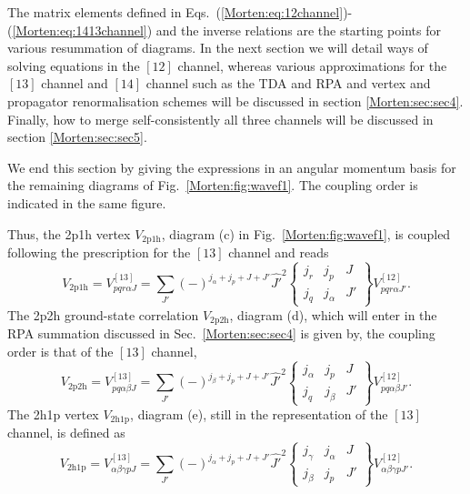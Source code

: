 The matrix elements defined in 
Eqs.~(\ref{Morten:eq:12channel})-(\ref{Morten:eq:1413channel}) 
and the inverse relations are the 
starting points for various resummation of diagrams.
In the next section we will detail ways of solving equations
in the $[12]$ channel, whereas various approximations for the 
$[13]$ channel and $[14]$ channel such as the TDA and RPA 
and  vertex and propagator renormalisation schemes 
will be discussed in section \ref{Morten:sec:sec4}. Finally, how to
merge self-consistently  all three channels will be discussed
in section \ref{Morten:sec:sec5}.

We end this section by giving the expressions in an angular momentum
basis for the remaining 
diagrams of Fig.~\ref{Morten:fig:wavef1}. The coupling order is indicated
in the same figure. 

Thus, the 2p1h vertex $V_{\mathrm{2p1h}}$, 
diagram (c) in  Fig.~\ref{Morten:fig:wavef1}, 
is coupled
following the prescription for the $[13]$ channel and reads
\begin{equation}
      V_{\mathrm{2p1h}}=V_{pqr\alpha J}^{[13]}=
      {\displaystyle \sum_{J'}}(-)^{j_{\alpha}+j_p+J+J'}\hat{J'}^2
      \left\{
      \begin{array}{ccc}
       j_r&j_p&J\\j_q&j_{\alpha}&J'
      \end{array}
       \right\}
       V_{pqr\alpha J'}^{[12]}.
       \label{Morten:eq:2p1hv}
\end{equation}
The 2p2h ground-state correlation $V_{\mathrm{2p2h}}$, diagram (d),
 which will enter
in the RPA summation discussed in Sec.~\ref{Morten:sec:sec4} is given by,
the coupling order is that of the $[13]$ channel, 
\begin{equation}
      V_{\mathrm{2p2h}}=V_{pq\alpha\beta J}^{[13]}=
      {\displaystyle \sum_{J'}}(-)^{j_{\beta}+j_p+J+J'}\hat{J'}^2
      \left\{
      \begin{array}{ccc}
       j_{\alpha}&j_p&J\\j_q&j_{\beta}&J'
      \end{array}
       \right\}
       V_{pq\alpha\beta J'}^{[12]}.
       \label{Morten:eq:2p2hv}
\end{equation}
The 2h1p vertex $V_{\mathrm{2h1p}}$, diagram (e), 
still in the representation of 
the $[13]$ channel, is defined as
\begin{equation}
      V_{\mathrm{2h1p}}=V_{\alpha\beta\gamma p J}^{[13]}=
      {\displaystyle \sum_{J'}}(-)^{j_{\alpha}+j_p+J+J'}\hat{J'}^2
      \left\{
      \begin{array}{ccc}
       j_{\gamma}&j_{\alpha}&J\\j_{\beta}&j_p&J'
      \end{array}
       \right\}
       V_{\alpha\beta\gamma p J'}^{[12]}.
       \label{Morten:eq:2h1pv}
\end{equation}
